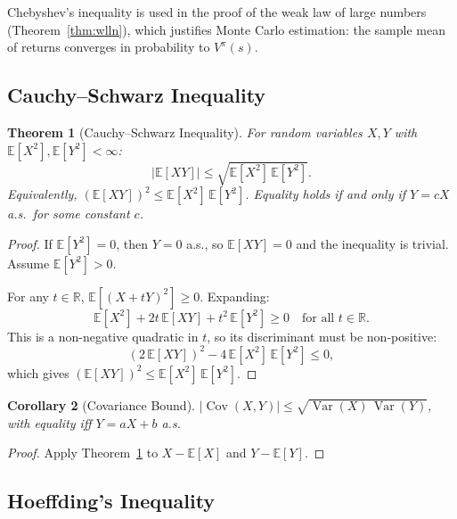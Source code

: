 \documentclass[11pt,a4paper]{article}
\theoremstyle{definition}
\theoremstyle{plain}
\newtheorem{theorem}{Theorem}[section]
\newtheorem{corollary}[theorem]{Corollary}
\theoremstyle{remark}
\DeclareMathOperator{\Var}{Var}
\DeclareMathOperator{\Cov}{Cov}
\newcommand{\E}{\mathbb{E}}
\newcommand{\R}{\mathbb{R}}
\begin{document}
\begin{rlconnection}[Connection to RL]
Chebyshev's inequality is used in the proof of the weak law of large numbers (Theorem~\ref{thm:wlln}), which justifies Monte Carlo estimation: the sample mean of returns converges in probability to $V^\pi(s)$.
\end{rlconnection}

\subsection{Cauchy--Schwarz Inequality}
\label{subsec:cauchy_schwarz}

\begin{theorem}[Cauchy--Schwarz Inequality]
\label{thm:cauchy_schwarz}
For random variables $X, Y$ with $\E[X^2], \E[Y^2] < \infty$:
\begin{equation}
    |\E[XY]| \leq \sqrt{\E[X^2]\, \E[Y^2]}.
    \label{eq:cauchy_schwarz}
\end{equation}
Equivalently, $(\E[XY])^2 \leq \E[X^2]\, \E[Y^2]$. Equality holds if and only if $Y = cX$ a.s.\ for some constant $c$.
\end{theorem}

\begin{proof}
If $\E[Y^2] = 0$, then $Y = 0$ a.s., so $\E[XY] = 0$ and the inequality is trivial. Assume $\E[Y^2] > 0$.

For any $t \in \R$, $\E[(X + tY)^2] \geq 0$. Expanding:
\begin{equation}
    \E[X^2] + 2t\,\E[XY] + t^2\,\E[Y^2] \geq 0 \quad \text{for all } t \in \R.
    \label{eq:cs_quadratic}
\end{equation}
This is a non-negative quadratic in $t$, so its discriminant must be non-positive:
\begin{equation}
    (2\,\E[XY])^2 - 4\,\E[X^2]\,\E[Y^2] \leq 0,
\end{equation}
which gives $(\E[XY])^2 \leq \E[X^2]\,\E[Y^2]$.
\end{proof}

\begin{corollary}[Covariance Bound]
\label{cor:cov_bound}
$|\Cov(X, Y)| \leq \sqrt{\Var(X)\,\Var(Y)}$, with equality iff $Y = aX + b$ a.s.
\end{corollary}

\begin{proof}
Apply Theorem~\ref{thm:cauchy_schwarz} to $X - \E[X]$ and $Y - \E[Y]$.
\end{proof}

\subsection{Hoeffding's Inequality}
\label{subsec:hoeffding}
\end{document}
